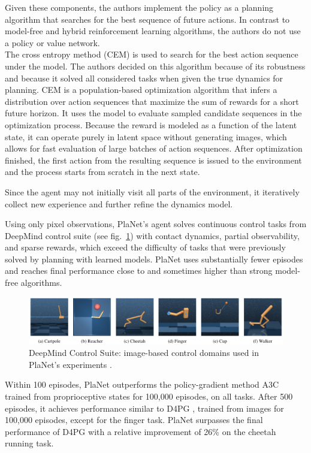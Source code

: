 Given these components, the authors implement the policy as a planning algorithm that searches for the best sequence of future actions. In contrast to model-free and hybrid reinforcement learning algorithms, the authors do not use a policy or value network. \\
The cross entropy method \cite{Algo.CEM} (CEM) is used to search for the best action sequence under the model. The authors decided on this algorithm because of its robustness and because it solved all considered tasks when given the true dynamics for planning. CEM is a population-based optimization algorithm that infers a distribution over action sequences that maximize the sum of rewards for a short future horizon. It uses the model to evaluate sampled candidate sequences in the optimization process. Because the reward is modeled as a function of the latent state, it can operate purely in latent space without generating images, which allows for fast evaluation of large batches of action sequences. After optimization finished, the first action from the resulting sequence is issued to the environment and the process starts from scratch in the next state.

Since the agent may not initially visit all parts of the environment, it iteratively collect new experience and further refine the dynamics model.

Using only pixel observations, PlaNet's agent solves continuous control tasks from DeepMind control suite (see fig.~\ref{Fig.DeepMindControlSuite}) with contact dynamics, partial observability, and sparse rewards, which exceed the difficulty of tasks that were previously solved by planning with learned models. PlaNet uses substantially fewer episodes and reaches final performance close to and sometimes higher than strong model-free algorithms.

\begin{figure}[H]
\includegraphics[width=1.0\textwidth,keepaspectratio]{figures/PlaNet/benchmarks.png}
\caption[DeepMind Control Suite]{DeepMind Control Suite: image-based control domains used in PlaNet's experiments \protect\cite{Algo.PlaNet}.}
\label{Fig.DeepMindControlSuite}
\end{figure}

Within 100 episodes, PlaNet outperforms the policy-gradient method A3C \cite{Algo.A3C} trained from proprioceptive states for 100,000 episodes, on all tasks. After 500 episodes, it achieves performance similar to D4PG \cite{Algo.D4PG}, trained from images for 100,000 episodes, except for the finger task. PlaNet surpasses the final performance of D4PG with a relative improvement of 26\% on the cheetah running task.

